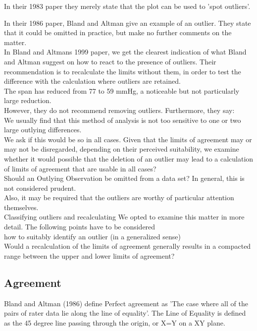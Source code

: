 \documentclass[12pt, a4paper]{report}
\theoremstyle{plain}
\theoremstyle{definition}
\theoremstyle{remark}
\begin{document}
	In their 1983 paper they merely state that the plot can be used to
	'spot outliers'.

	In  their 1986 paper, Bland and Altman give an example of an
	outlier. They state that it could be omitted in practice, but make
	no further comments on the matter.
	\\
	In Bland and Altmans 1999 paper, we get the clearest indication of
	what Bland and Altman suggest on how to react to the presence of
	outliers. Their recommendation is to recalculate the limits
	without them, in order to test the difference with the calculation
	where outliers are retained.\\
	
	The span has reduced from 77 to 59 mmHg, a noticeable but not
	particularly large reduction.
	\\
	However, they do not recommend removing outliers. Furthermore,
	they say:
	\\
	We usually find that this method of analysis is not too sensitive
	to one or two large outlying differences.
	\\
	We ask if this would be so in all cases. Given that the limits of
	agreement may or may not be disregarded, depending on their
	perceived suitability, we examine whether it would possible that
	the deletion of an outlier may lead to a calculation of limits of
	agreement that are usable in all cases?
	\\
	Should an Outlying Observation be omitted from a data set? In
	general, this is not considered prudent.
	\\
	Also, it may be required that the outliers are worthy of
	particular attention themselves.
	\\
	Classifying outliers and recalculating We opted to examine this
	matter in more detail. The following points have to be considered
	\\how to suitably identify an outlier (in a generalized sense)
	\\Would a recalculation of the limits of agreement generally
	results in  a compacted range between the upper and lower limits
	of agreement?
	\subsection{Agreement} Bland and Altman (1986) define Perfect
	agreement as 'The case where all of the pairs of rater data lie
	along the line of equality'. The Line of Equality is defined as
	the 45 degree line passing through the origin, or X=Y on a XY
	plane.
	
\end{document}
